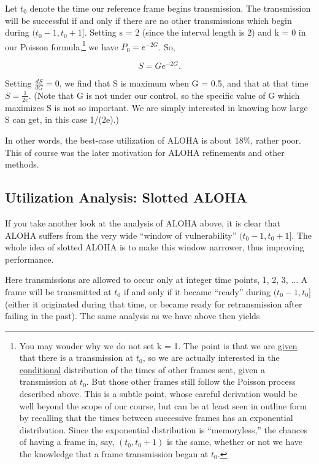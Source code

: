 \documentclass[11pt]{article}
\begin{document}
Let $t_0$ denote the time our reference frame begins transmission.  The
transmission will be successful if and only if there are no other
transmissions which begin during $(t_0 - 1,t_0 + 1]$.  Setting s = 2
(since the interval length is 2) and k = 0 in our Poisson
formula,\footnote{You may wonder why we do not set k = 1.  The point is
that we are \underline{given} that there is a transmission at $t_0$, so
we are actually interested in the \underline{conditional} distribution
of the times of other frames sent, given a transmission at $t_0$.  But
those other frames still follow the Poisson process described above.
This is a subtle point, whose careful derivation would be well beyond
the scope of our course, but can be at least seen in outline form by
recalling that the times between successive frames has an exponential
distribution.  Since the exponential distribution is ``memoryless,'' the
chances of having a frame in, say, $(t_0,t_0+1)$ is the same, whether or
not we have the knowledge that a frame transmission began at $t_0$.} we
have $P_0 = e^{-2G}$.  So, 

\begin{equation}
S = G e^{-2G}.
\end{equation}

Setting $\frac{dS}{dG} = 0$, we find that S is maximum when G = 0.5,
and that at that time $S = \frac{1}{2e}$.  (Note that G is not
under our control, so the specific value of G which maximizes S is
not so important.  We are simply interested in knowing how large
S can get, in this case 1/(2e).)

In other words, the best-case utilization of ALOHA is about 18\%,
rather poor.  This of course was the later motivation for ALOHA
refinements and other methods.

\subsection{Utilization Analysis:  Slotted ALOHA}

If you take another look at the analysis of ALOHA above, it is clear
that ALOHA suffers from the very wide ``window of vulnerability''
$(t_0 - 1,t_0 + 1]$.  The whole idea of slotted ALOHA is to make
this window narrower, thus improving performance.

Here transmissions are allowed to occur only at integer time points, 1,
2, 3, ...  A frame will be transmitted at $t_0$ if and only if it became
``ready'' during $(t_0 - 1,t_0]$ (either it originated during that time,
or became ready for retransmission after failing in the past).  The same
analysis as we have above then yields
\end{document}
